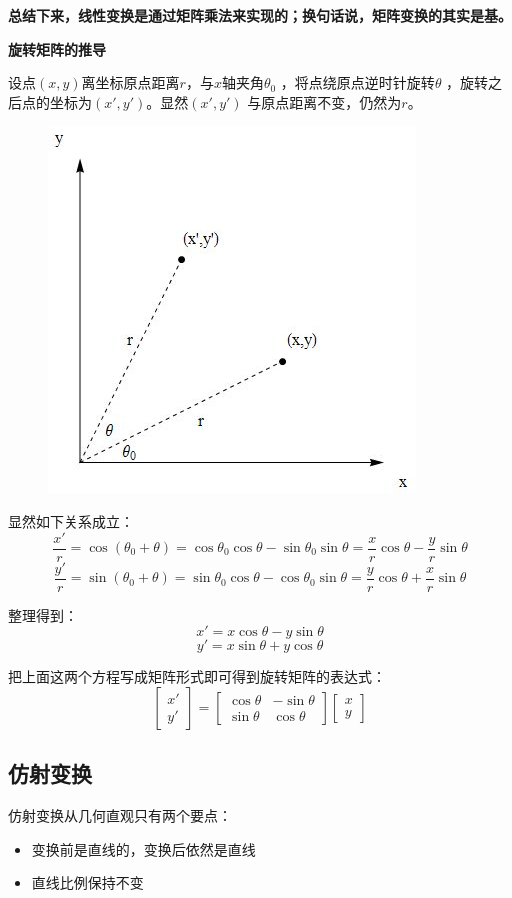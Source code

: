 \documentclass[12pt]{article}
\begin{document}
\textbf{总结下来，线性变换是通过矩阵乘法来实现的；换句话说，矩阵变换的其实是基。}

\begin{framed}  
\small{
\textbf{旋转矩阵的推导}

设点$(x,y)$离坐标原点距离$r$，与$x$轴夹角$\theta_0$ ，将点绕原点逆时针旋转$\theta$ ，旋转之后点的坐标为$(x',y')$。显然$(x',y')$ 与原点距离不变，仍然为$r$。
\begin{figure}[H]
\centering
\includegraphics[width=.3\textwidth]{fig/UnderstandRotateMatrix.jpg}
\end{figure}

显然如下关系成立：
$$
\frac{x'}{r} = \cos{(\theta_0+\theta)} = \cos{\theta_0}\cos{\theta} - \sin{\theta_0}\sin{\theta} = \frac{x}{r}\cos{\theta} - \frac{y}{r}\sin{\theta}
$$
$$
\frac{y'}{r} = \sin{(\theta_0+\theta)} = \sin{\theta_0}\cos{\theta} - \cos{\theta_0}\sin{\theta} = \frac{y}{r}\cos{\theta} + \frac{x}{r}\sin{\theta}
$$

整理得到：
$$
x' = x\cos{\theta} - y\sin{\theta}
$$
$$
y' = x\sin{\theta} + y\cos{\theta}
$$

把上面这两个方程写成矩阵形式即可得到旋转矩阵的表达式：
$$
\begin{bmatrix}
x'\\y'
\end{bmatrix} = 
\begin{bmatrix}
\cos{\theta} & -\sin{\theta} \\
\sin{\theta} & \cos{\theta}
\end{bmatrix}
\begin{bmatrix}
x\\y
\end{bmatrix}
$$
}
\end{framed}

\subsection{仿射变换}
仿射变换从几何直观只有两个要点：
\begin{itemize}
    \item 变换前是直线的，变换后依然是直线
    \item 直线比例保持不变
\end{itemize}
\end{document}
